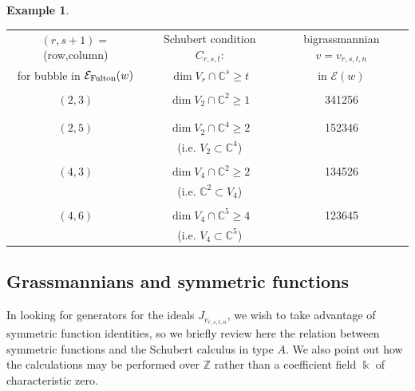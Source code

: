 \documentclass[12pt,dvips]{amsart}
\theoremstyle{plain}
\theoremstyle{definition}
\newtheorem{example}[theorem]{Example}
\theoremstyle{remark}
\numberwithin{equation}{section}
\def\ZZ{{\mathbb Z}}
\def\CC{{\mathbb C}}
\def\Ess{{\mathcal{E}}}
\begin{document}
\begin{example}
\begin{tabular}{|c|c|c|}\hline
$(r,s+1) = $ (row,column)       & Schubert condition $C_{r,s,t}$:   & bigrassmannian $v=v_{r,s,t,n}$ \\
for bubble in $\Ess_{\rm Fulton}(w)$   & $\dim V_r \cap \CC^s \geq t$      & in $\Ess(w)$  \\ \hline\hline      
        &                              &        \\ 
$(2,3)$ & $\dim V_2 \cap \CC^2 \geq 1$ & 341256 \\ 
        &                              &        \\ \hline
        &                              &        \\ 
$(2,5)$ & $\dim V_2 \cap \CC^4 \geq 2$ & 152346 \\ 
        & (i.e. $V_2 \subset  \CC^4$)  &        \\ \hline
        &                              &        \\ 
$(4,3)$ & $\dim V_4 \cap \CC^2 \geq 2$ & 134526 \\ 
        & (i.e. $\CC^2 \subset  V_4$)   &        \\ \hline
        &                              &        \\ 
$(4,6)$ & $\dim V_4 \cap \CC^5 \geq 4$ & 123645 \\ 
        & (i.e. $V_4 \subset  \CC^5$)  &        \\ \hline
\end{tabular}


\end{example}



\subsection{Grassmannians and symmetric functions}
\label{LS-subsection}
  In looking for generators for the ideals $J_{v_{r,s,t,n}}$, we wish
to take advantage of symmetric function identities, so we briefly review here
the relation between symmetric functions and the Schubert calculus in type $A$.
We also point out how the calculations may be performed over $\ZZ$
rather than a coefficient field $\Bbbk$ of characteristic zero.
\end{document}
